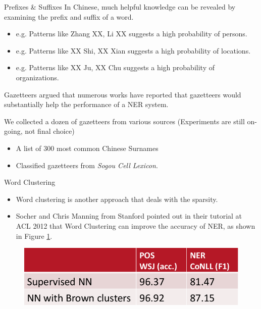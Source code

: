 \documentclass{beamer}
\begin{document}
\begin{frame}{Prefixes \& Suffixes}
	In Chinese, much helpful knowledge can be revealed by examining the prefix and suffix of a word.
	\pause
	\begin{itemize}
		\item e.g. Patterns like { Zhang XX, Li XX suggests a high probability of persons.}
			\pause
		\item e.g. Patterns like XX Shi, XX Xian suggests a high probability of locations.
			\pause
		\item e.g. Patterns like XX Ju, XX Chu suggests a high probability of organizations.
	\end{itemize}
\end{frame}

\begin{frame}{Gazetteers}
	\citep{ratinov2009design} argued that numerous works have reported that gazetteers would substantially help the performance of a NER system.\citep{cohen2004exploiting,kazama2007exploiting,florian2003named}
	\pause
	\vspace{0.5cm}

	We collected a dozen of gazetteers from various sources (Experiments are still on-going, not final choice)
	\begin{itemize}
		\item A list of 300 most common Chinese Surnames
		\item Classified gazetteers from \textit{Sogou Cell Lexicon}.
	\end{itemize}
\end{frame}

\begin{frame}{Word Clustering}
	\begin{itemize}
		\item Word clustering is another approach that deals with the sparsity.
			\pause
		\item	Socher and Chris Manning from Stanford pointed out in their tutorial at ACL 2012\citep{socher2012deep} that Word Clustering can improve the accuracy of NER, as shown in Figure \ref{fig:cluster}.
	\end{itemize}
	\begin{figure}[h]
		\centering
		\includegraphics[height=0.25\textheight]{./figures/socher-clustering.png}
		\label{fig:cluster}
	\end{figure}
\end{frame}
\end{document}
